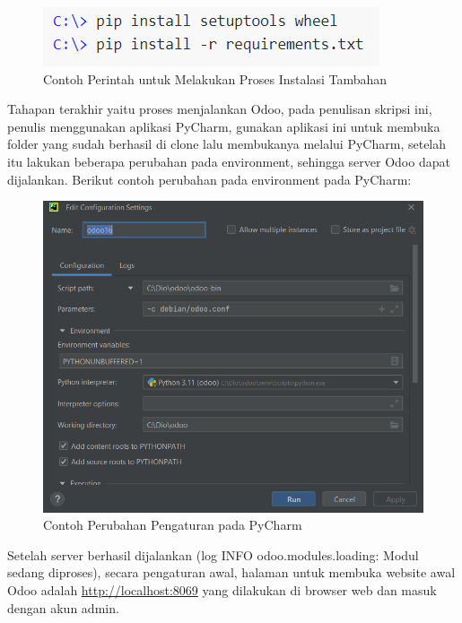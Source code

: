 \begin{figure}[H]
	\centering
	\includegraphics[scale=1]{Gambar/setupOdoo.png}
	\caption{Contoh Perintah untuk Melakukan Proses Instalasi Tambahan} 
	\label{fig:setupOdoo}
\end{figure}

Tahapan terakhir yaitu proses menjalankan Odoo, pada penulisan skripsi ini, penulis menggunakan aplikasi PyCharm, gunakan aplikasi ini untuk membuka folder yang sudah berhasil di clone lalu membukanya melalui PyCharm, setelah itu lakukan beberapa perubahan pada environment, sehingga server Odoo dapat dijalankan. Berikut contoh perubahan pada environment pada PyCharm:

\begin{figure}[H]
	\centering
	\includegraphics[scale=0.7]{Gambar/pycharm.png}
	\caption{Contoh Perubahan Pengaturan pada PyCharm} 
	\label{fig:pycharm}
\end{figure}

Setelah server berhasil dijalankan (log INFO odoo.modules.loading: Modul sedang diproses), secara pengaturan awal, halaman untuk membuka website awal Odoo adalah \url{http://localhost:8069} yang dilakukan di browser web dan masuk dengan akun admin.

